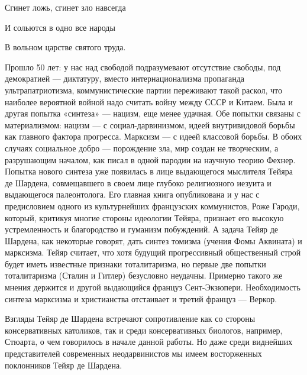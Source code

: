 Сгинет ложь, сгинет зло навсегда

И сольются в одно все народы

В вольном царстве святого труда.

Прошло 50  лет: у нас  над свободой подразумевают  отсутствие свободы,
под  демократией ---  диктатуру,  вместо интернационализма  пропаганда
ультрапатриотизма,  коммунистические партии  переживают такой  раскол,
что наиболее вероятной войной надо  считать войну между СССР и Китаем.
Была и  другая попытка  «синтеза» --- нацизм,  еще менее  удачная. Обе
попытки  связаны с  материализмом:  нацизм  --- с  социал-дарвинизмом,
идеей внутривидовой  борьбы как  главного фактора  прогресса. Марксизм
--- с  идеей классовой  борьбы. В обоих  случаях социальное  добро ---
порождение зла, мир  создан не творческим, а  разрушающим началом, как
писал  в  одной  пародии  на научную  теорию  Фехнер.  Попытка  нового
синтеза уже появилась в лице  выдающегося мыслителя Тейяра де Шардена,
совмещавшего в  своем лице глубоко религиозного  иезуита и выдающегося
палеонтолога. Его  главная книга опубликована  и у нас  с предисловием
одного из культурнейших французских коммунистов, Роже Гароди, который,
критикуя  многие  стороны  идеологии   Тейяра,  признает  его  высокую
устремленность и благородство и гуманизм побуждений. А задача Тейяр де
Шардена,  как  некоторые говорят,  дать  синтез  томизма (учения  Фомы
Аквината) и  марксизма. Тейяр считает, что  хотя будущий прогрессивный
общественный  строй  будет  иметь  известные  признаки  тоталитаризма,
но  первые  две попытки  тоталитаризма  (Сталин  и Гитлер)  безусловно
неудачны.  Примерно  такого же  мнения  держится  и другой  выдающийся
француз Сент-Экзюпери. Необходимость  синтеза марксизма и христианства
отстаивает и третий француз --- Веркор.

Взгляды  Тейяр  де  Шардена  встречают сопротивление  как  со  стороны
консервативных  католиков,   так  и  среди   консервативных  биологов,
например, Стюарта,  о чем говорилось  в начале данной работы.  Но даже
среди  виднейших представителей  современных  неодарвинистов мы  имеем
восторженных поклонников Тейяр де Шардена.

